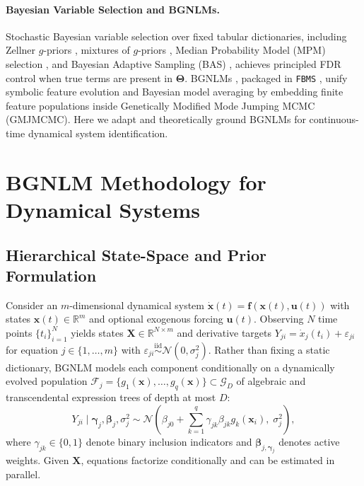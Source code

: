 \documentclass{article}
\begin{document}
\paragraph{Bayesian Variable Selection and BGNLMs.}
Stochastic Bayesian variable selection over fixed tabular dictionaries, including Zellner $g$-priors \citep{zellner1986assessing}, mixtures of $g$-priors \citep{liang2008mixtures}, Median Probability Model (MPM) selection \citep{barbieri2004optimal}, and Bayesian Adaptive Sampling (BAS) \citep{clyde2011bayesian}, achieves principled FDR control when true terms are present in $\boldsymbol{\Theta}$. BGNLMs \citep{hubin2018mode,hubin2021flexible}, packaged in \texttt{FBMS} \citep{lachmann2025fbms}, unify symbolic feature evolution and Bayesian model averaging by embedding finite feature populations inside Genetically Modified Mode Jumping MCMC (GMJMCMC). Here we adapt and theoretically ground BGNLMs for continuous-time dynamical system identification.

\section{BGNLM Methodology for Dynamical Systems}

\subsection{Hierarchical State-Space and Prior Formulation}

Consider an $m$-dimensional dynamical system $\dot{\boldsymbol{x}}(t) = \boldsymbol{f}(\boldsymbol{x}(t), \boldsymbol{u}(t))$ with states $\boldsymbol{x}(t) \in \mathbb{R}^m$ and optional exogenous forcing $\boldsymbol{u}(t)$. Observing $N$ time points $\{t_i\}_{i=1}^N$ yields states $\boldsymbol{X} \in \mathbb{R}^{N \times m}$ and derivative targets $Y_{ji} = \dot{x}_j(t_i) + \varepsilon_{ji}$ for equation $j \in \{1,\dots,m\}$ with $\varepsilon_{ji} \stackrel{\text{iid}}{\sim} \mathcal{N}(0, \sigma_j^2)$. Rather than fixing a static dictionary, BGNLM models each component conditionally on a dynamically evolved population $\mathcal{F}_j = \{g_1(\boldsymbol{x}), \dots, g_q(\boldsymbol{x})\} \subset \mathcal{G}_D$ of algebraic and transcendental expression trees of depth at most $D$:
\begin{equation}
  Y_{ji} \mid \boldsymbol{\gamma}_j, \boldsymbol{\beta}_j, \sigma_j^2 \sim \mathcal{N}\!\left(\beta_{j0} + \sum_{k=1}^{q} \gamma_{jk}\beta_{jk}g_k(\boldsymbol{x}_i), \; \sigma_j^2\right),
\end{equation}
where $\gamma_{jk} \in \{0,1\}$ denote binary inclusion indicators and $\boldsymbol{\beta}_{j,\boldsymbol{\gamma}_j}$ denotes active weights. Given $\boldsymbol{X}$, equations factorize conditionally and can be estimated in parallel.
\end{document}
